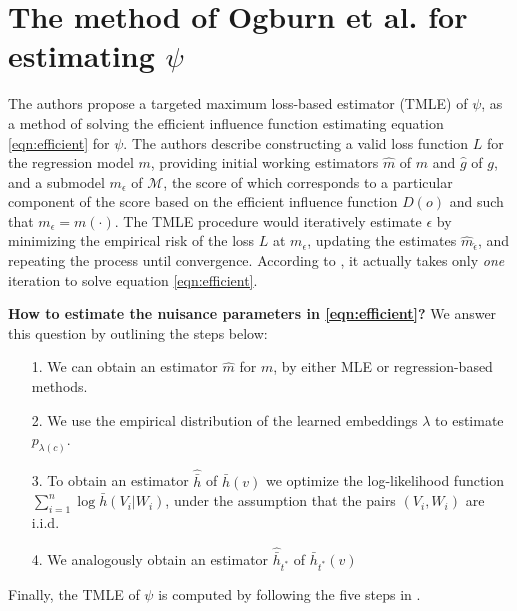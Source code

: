 \documentclass{article}
\begin{document}
\printbibliography

\newpage
\appendix


\section{The method of Ogburn et al. \cite{Ogburn:Sofrygin:Diaz:vanderLaan:2017} for estimating $\psi$}
\label{appendix:estimation}
The authors propose a targeted maximum loss-based estimator (TMLE) of $\psi$, as a method of solving the efficient influence function estimating equation \ref{eqn:efficient} for $\psi$. The authors describe constructing a valid loss function $L$ for the regression model $m$, providing initial working estimators $\hat{m}$ of $m$ and $\hat{g}$ of $g$, and a submodel $m_{\epsilon}$ of $\mathcal{M}$, the score of which corresponds to a particular component of the score based on the efficient influence function $D(o)$ and such that $m_{\epsilon} = m(\cdot)$. The TMLE procedure would iteratively estimate $\epsilon$ by minimizing the empirical risk of the loss $L$ at $m_{\epsilon}$, updating the estimates $\hat{m}_{\hat{\epsilon}}$, and repeating the process until convergence. According to \cite{Ogburn:Sofrygin:Diaz:vanderLaan:2017}, it actually takes only \textit{one} iteration to solve equation \ref{eqn:efficient}. 

\textbf{How to estimate the nuisance parameters in \ref{eqn:efficient}?} We answer this question by outlining the steps below:

\begin{itemize}
    \item[1.] We can obtain an estimator $\hat{m}$ for $m$, by either MLE or regression-based methods. 
    \item[2.] We use the empirical distribution of the learned embeddings $\lambda$ to estimate $p_{\lambda(c)}$. 
    \item[3.] To obtain an estimator $\hat{\bar{h}}$ of $\bar{h}(v)$ we optimize the log-likelihood function $\sum_{i=1}^n \log \bar{h}(V_i|W_i)$, under the assumption that the pairs $(V_i, W_i)$ are i.i.d.
    \item[4.] We analogously obtain an estimator $\hat{\bar{h}}_{t^*}$ of $\bar{h}_{t^*}(v)$ 
\end{itemize}

Finally, the TMLE of $\psi$ is computed by following the five steps in \cite{Ogburn:Sofrygin:Diaz:vanderLaan:2017}. 
\end{document}
